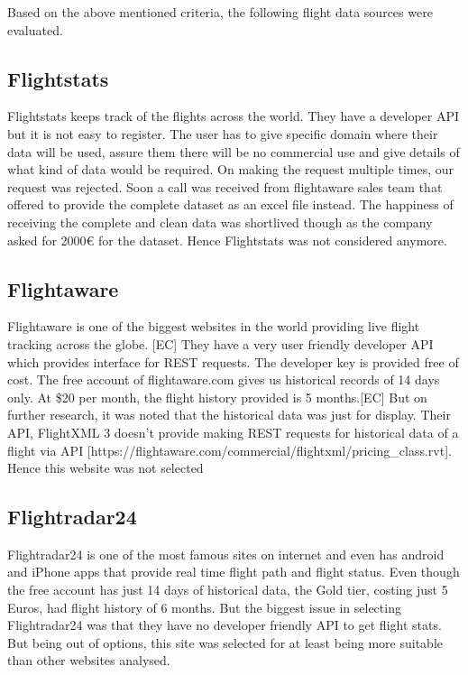Based on the above mentioned criteria, the following flight data sources were evaluated. 
\subsection{Flightstats}
Flightstats keeps track of the flights across the world. They have a developer API but it is not easy to register. The user has to give specific domain where their data will be used, assure them there will be no commercial use and give details of what kind of data would be required. On making the request multiple times, our request was rejected. Soon a call was received from flightaware sales team that offered to provide the complete dataset as an excel file instead. The happiness of receiving the complete and clean data was shortlived though as the company asked for 2000€ for the dataset. Hence Flightstats was not considered anymore.

\subsection{Flightaware}
Flightaware is one of the biggest websites in the world providing live flight tracking across the globe. [EC] They have a very user friendly developer API which provides interface for REST requests. The developer key is provided free of cost. The free account of flightaware.com gives us historical records of 14 days only. At \$20 per month, the flight history provided is 5 months.[EC] But on further research, it was noted that  the historical data was just for display. Their API, FlightXML 3 doesn't provide making REST requests for historical data of a flight via API [https://flightaware.com/commercial/flightxml/pricing_class.rvt].
Hence this website was not selected

\subsection{Flightradar24}
Flightradar24 is one of the most famous sites on internet and even has android and iPhone apps that provide real time flight path and flight status. Even though the free account has just 14 days of historical data, the Gold tier, costing just 5 Euros, had flight history of 6 months. But the biggest issue in selecting Flightradar24 was that they have no developer friendly API to get flight stats. But being out of options, this site was selected for at least being more suitable than other websites analysed.

